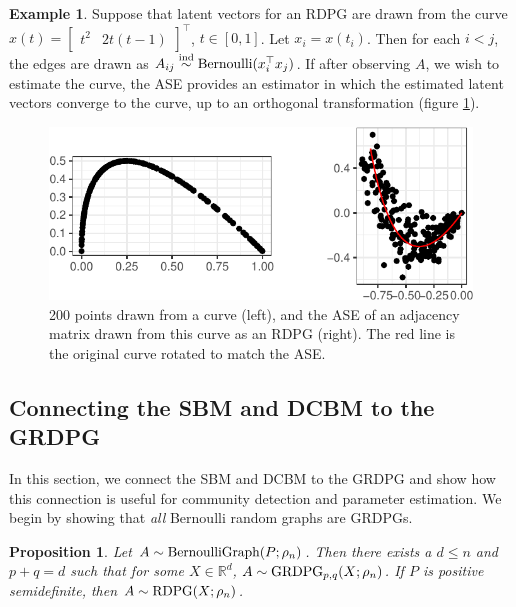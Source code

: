 \documentclass[
  11pt,
]{article}
\newtheorem{proposition}{Proposition}[section]
\theoremstyle{definition}
\theoremstyle{definition}
\newtheorem{example}{Example}[section]
\theoremstyle{definition}
\theoremstyle{definition}
\theoremstyle{remark}
\begin{document}
\begin{example}
Suppose that latent vectors for an RDPG are drawn from the curve 
$x(t) = \begin{bmatrix} t^2 & 2 t (t-1) \end{bmatrix}^\top$, $t \in [0, 1]$. 
Let $x_i = x(t_i)$. 
Then for each $i < j$, the edges are drawn as $A_{ij} \stackrel{\mathrm{ind}}{\sim} \mathrm{Bernoulli}(x_i^\top x_j)$. 
If after observing $A$, we wish to estimate the curve, the ASE provides an estimator in which the estimated latent vectors converge to the curve, up to an orthogonal transformation (figure \ref{fig:ase-example}). 

\begin{figure}[H]

{\centering \includegraphics{draft_files/figure-latex/ase-example-1} 

}

\caption{200 points drawn from a curve (left), and the ASE of an adjacency matrix drawn from this curve as an RDPG (right). The red line is the original curve rotated to match the ASE.}\label{fig:ase-example}
\end{figure}


\end{example}

\hypertarget{sec:sbm-dcbm-grdpg}{%
\subsection{Connecting the SBM and DCBM to the GRDPG}\label{sec:sbm-dcbm-grdpg}}

In this section, we connect the SBM and DCBM to the GRDPG and show how this connection is useful for community detection and parameter estimation.
We begin by showing that \emph{all} Bernoulli random graphs are GRDPGs.

\begin{proposition}
Let $A \sim \mathrm{BernoulliGraph}(P; \rho_n)$. 
Then there exists a $d \leq n$ and $p + q = d$ such that for some $X \in \mathbb{R}^d$, $A \sim \mathrm{GRDPG}_{p, q}(X; \rho_n)$. 
If $P$ is positive semidefinite, then $A \sim \mathrm{RDPG}(X; \rho_n)$. 
\end{proposition}
\end{document}
